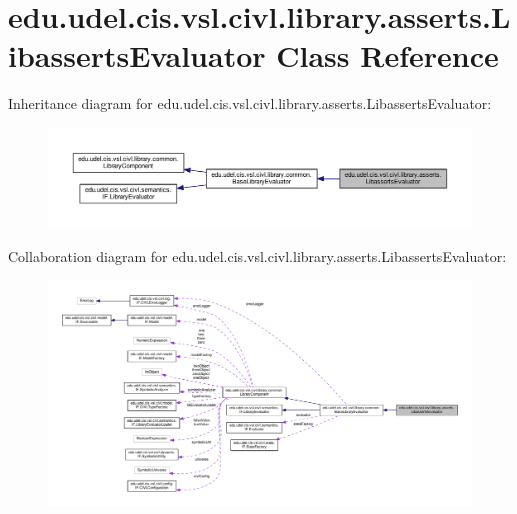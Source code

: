 \hypertarget{classedu_1_1udel_1_1cis_1_1vsl_1_1civl_1_1library_1_1asserts_1_1LibassertsEvaluator}{}\section{edu.\+udel.\+cis.\+vsl.\+civl.\+library.\+asserts.\+Libasserts\+Evaluator Class Reference}
\label{classedu_1_1udel_1_1cis_1_1vsl_1_1civl_1_1library_1_1asserts_1_1LibassertsEvaluator}


Inheritance diagram for edu.\+udel.\+cis.\+vsl.\+civl.\+library.\+asserts.\+Libasserts\+Evaluator\+:
\nopagebreak
\begin{figure}[H]
\begin{center}
\leavevmode
\includegraphics[width=350pt]{classedu_1_1udel_1_1cis_1_1vsl_1_1civl_1_1library_1_1asserts_1_1LibassertsEvaluator__inherit__graph}
\end{center}
\end{figure}


Collaboration diagram for edu.\+udel.\+cis.\+vsl.\+civl.\+library.\+asserts.\+Libasserts\+Evaluator\+:
\nopagebreak
\begin{figure}[H]
\begin{center}
\leavevmode
\includegraphics[width=350pt]{classedu_1_1udel_1_1cis_1_1vsl_1_1civl_1_1library_1_1asserts_1_1LibassertsEvaluator__coll__graph}
\end{center}
\end{figure}
